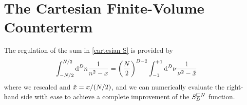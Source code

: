 \section{The Cartesian \Luscher Finite-Volume Counterterm}\label{sec:counterterm/cartesian}

The regulation of the sum in \eqref{cartesian S} is provided by
\begin{equation}
    \label{eq:cartesian S counterterm}
    \int_{-N/2}^{N/2} \mathrm{d}^Dn \frac{1}{n^2-x}
    =
    \left(\frac{N}{2}\right)^{D-2} \int_{-1}^{+1} \mathrm{d}^D\nu \frac{1}{\nu^2 - \tilde{x}}
\end{equation}
where we rescaled and $\tilde{x}=x/(N/2)$, and we can numerically evaluate the right-hand side with ease to achieve a complete improvement of the $S_D^{\square N}$ function.


